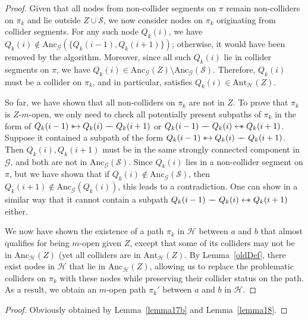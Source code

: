 \documentclass[accepted]{uai2025} %
\newcommand{\anc}{\text{Anc}}
\newcommand{\ant}{\text{Ant}}
\newcommand{\hus}{\mathrel{{\leftarrow\mkern-11mu\ast}}}
\newcommand{\suh}{\mathrel{{\ast\mkern-11mu\to}}}
\newcommand{\tut}{\mathrel{{\relbar\mkern-9mu\relbar}}}
\begin{document}
\begin{proof}
Given that all nodes from non-collider segments on \( \pi \) remain non-colliders on \( \pi_k \) and lie outside \( Z \cup \mathcal{S} \), we now consider nodes on \( \pi_k \) originating from collider segments. For any such node \( Q_k(i) \), we have \( Q_k(i) \notin \anc_\mathcal{G}(\{Q_k(i-1), Q_k(i+1)\}) \); otherwise, it would have been removed by the algorithm. Moreover, since all such \( Q_k(i) \) lie in collider segments on \( \pi \), we have \( Q_k(i) \in \anc_\mathcal{G}(Z) \setminus \anc_\mathcal{G}(\mathcal{S}) \). Therefore, \( Q_k(i) \) must be a collider on \( \pi_k \), and in particular, satisfies \( Q_k(i) \in \ant_\mathcal{H}(Z) \).


So far, we have shown that all non-colliders on \( \pi_k \) are not in \( Z \). To prove that \( \pi_k \) is \( Z \)-$m$-open, we only need to check all potentially present subpaths of \( \pi_k \) in the form of \( Q_k(i-1) \suh Q_k(i) \tut Q_k(i+1) \) or \( Q_k(i-1) \tut Q_k(i) \hus Q_k(i+1) \). Suppose it contained a subpath of the form \( Q_k(i-1) \suh Q_k(i) \tut Q_k(i+1) \). Then $Q_k(i),Q_k(i+1)$ must be in the same strongly connected component in $\mathcal{G}$, and both are not in $\anc_\mathcal{G}(\mathcal{S})$. Since \( Q_k(i) \) lies in a non-collider segment on \( \pi \), but we have shown that if \( Q_k(i) \notin \anc_\mathcal{G}(\mathcal{S}) \), then \( Q_k(i+1) \notin \anc_\mathcal{G}(Q_k(i)) \), this leads to a contradiction. One can show in a similar way that it cannot contain a subpath \( Q_k(i-1) \tut Q_k(i) \hus Q_k(i+1) \) either.

We now have shown the existence of a path $\pi_k$ in $\mathcal{H}$ between $a$ and $b$ that almost qualifies for being $m$-open given $Z$, except that some of its colliders may not be in $\anc_\mathcal{H}(Z)$ (yet all colliders are in $\ant_\mathcal{H}(Z)$. By Lemma~\ref{oldDef}, there exist nodes in \( \mathcal{H} \) that lie in \( \anc_\mathcal{H}(Z) \), allowing us to replace the problematic colliders on \( \pi_k \) with these nodes while preserving their collider status on the path. As a result, we obtain an \( m \)-open path \( \pi_k' \) between \( a \) and \( b \) in \( \mathcal{H} \).
\end{proof}


\thmtwo*
\begin{proof}
Obviously obtained by Lemma~\ref{lemma17b} and Lemma~\ref{lemma18}.
\end{proof}
\end{document}

